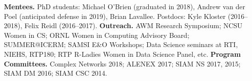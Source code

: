\begin{small}
\noindent \textbf{Mentees.} PhD students: Michael O'Brien (graduated in 2018), Andrew van der Poel (anticipated defense in 2019), Brian Lavallee. Postdocs: Kyle Kloster (2016--2018), Felix Reidl (2016--2017).
\vskip 0.1cm
\noindent \textbf{Outreach.}  AWM Research Symposium;  NCSU Women in CS; ORNL Women in Computing Advisory Board; SUMMER@ICERM; SAMSI E\&O Workshops; Data Science seminars at RTI, NIEHS, RTP180; RTP R-Ladies Women in Data Science Panel, etc.
\vskip 0.1cm
\noindent \textbf{Program Committees.} Complex Networks 2018; ALENEX 2017; SIAM NS 2017, 2015; SIAM DM 2016; SIAM CSC 2014.
\end{small}
